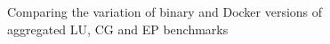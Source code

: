 \begin{figure}
    \caption{Comparing the variation of binary and Docker versions of aggregated \textsf{LU}, \textsf{CG} and \textsf{EP} benchmarks}\label{fig:docker}
\end{figure}